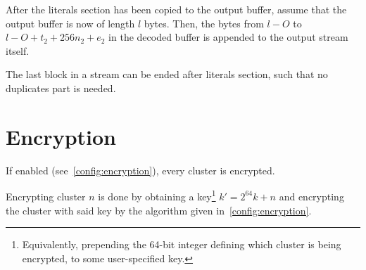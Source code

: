 \documentclass[11pt,a4paper]{report}
\begin{document}
        After the literals section has been copied to the output buffer, assume
        that the output buffer is now of length $l$ bytes. Then, the bytes from
        $l - O$ to $l - O + t_2 + 256n_2 + e_2$ in the decoded buffer is
        appended to the output stream itself.

        The last block in a stream can be ended after literals
        section, such that no duplicates part is needed.

    \section{Encryption}
    \label{encryption}
        If enabled (see~\ref{config:encryption}), every cluster is encrypted.

        Encrypting cluster $n$ is done by obtaining a
        key\footnote{Equivalently, prepending the 64-bit integer defining which
        cluster is being encrypted, to some user-specified key.} $k' = 2^{64}k
        + n$ and encrypting the cluster with said key by the algorithm given
        in~\ref{config:encryption}.
\end{document}
